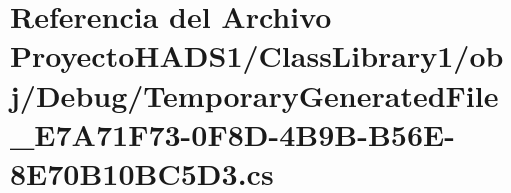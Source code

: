 \hypertarget{_proyecto_h_a_d_s1_2_class_library1_2obj_2_debug_2_temporary_generated_file___e7_a71_f73-0_f8_d-724484c9abe1426de4cce26f30dc3097}{}\section{Referencia del Archivo Proyecto\+H\+A\+D\+S1/\+Class\+Library1/obj/\+Debug/\+Temporary\+Generated\+File\+\_\+\+E7\+A71\+F73-\/0\+F8\+D-\/4\+B9\+B-\/\+B56\+E-\/8\+E70\+B10\+B\+C5\+D3.cs}
\label{_proyecto_h_a_d_s1_2_class_library1_2obj_2_debug_2_temporary_generated_file___e7_a71_f73-0_f8_d-724484c9abe1426de4cce26f30dc3097}
